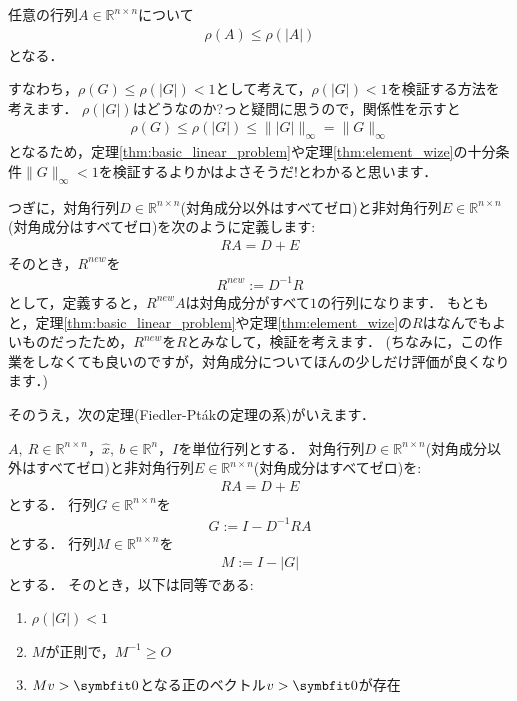 \begin{Thm}\label{thm:spec_abs}
	任意の行列$A \in {\mathbb R}^{n \times n}$について
	\begin{align*}
		\rho(A) \le \rho(|A|)
	\end{align*}	
	となる．
\end{Thm}

すなわち，$\rho(G) \le \rho(| G  |) < 1$として考えて，$\rho(| G |) < 1$を検証する方法を考えます．
$\rho(| G |)$はどうなのか?っと疑問に思うので，関係性を示すと
	\begin{align*}
		\rho( G ) \le \rho(|G|) \le \| |G| \|_{\infty} = \| G \|_{\infty}
	\end{align*}	
となるため，定理\ref{thm:basic_linear_problem}や定理\ref{thm:element_wize}の十分条件$\| G \|_{\infty} < 1$を検証するよりかはよさそうだ!とわかると思います．

つぎに，対角行列$D \in {\mathbb R}^{n \times n} $(対角成分以外はすべてゼロ)と非対角行列$E \in {\mathbb R}^{n \times n}$(対角成分はすべてゼロ)を次のように定義します:
\begin{align*}
	RA = D + E
\end{align*}	
そのとき，$R^{new}$を
\begin{align*}
	R^{new} := D^{-1} R 
\end{align*}	
として，定義すると，$R^{new}A$は対角成分がすべて$1$の行列になります．
もともと，定理\ref{thm:basic_linear_problem}や定理\ref{thm:element_wize}の$R$はなんでもよいものだったため，$R^{new}$を$R$とみなして，検証を考えます．
(ちなみに，この作業をしなくても良いのですが，対角成分についてほんの少しだけ評価が良くなります．)

そのうえ，次の定理(Fiedler-Pt\'akの定理の系)がいえます．

\begin{Thm}\label{thm:fiedler}
	$A,\ R\in {\mathbb R}^{n\times n}$，$\hat{x},\ b\in {\mathbb R}^n$，$I$を単位行列とする．
	対角行列$D \in {\mathbb R}^{n \times n} $(対角成分以外はすべてゼロ)と非対角行列$E \in {\mathbb R}^{n \times n}$(対角成分はすべてゼロ)を:
	\begin{align*}
		RA = D + E
	\end{align*}	
	とする．
	行列$G \in {\mathbb R}^{n\times n}$を
	\begin{align*}
		G := I - D^{-1}RA
	\end{align*}
	とする．
	行列$M \in {\mathbb R}^{n\times n}$を
	\begin{align*}
		M := I - |G|
	\end{align*}
	とする．
	そのとき，以下は同等である:
	\begin{enumerate}
		\item $\rho( | G | ) < 1$
		\item $M$が正則で，$M^{-1} \ge O$
		\item $M v > \vector{0}$となる正のベクトル$v > \vector{0}$が存在
	\end{enumerate}
\end{Thm}

